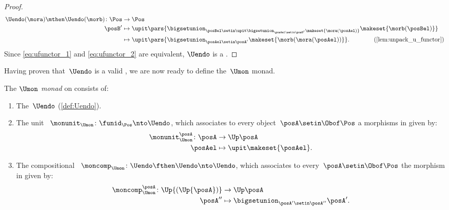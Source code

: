 \begin{proof}
\begin{equation}
\begin{aligned}
            \Uendo(\mora)\mthen \Uendo(\morb)\colon \Pos & \to \Pos \\
            \posB'                                       & \mapsto \upit \pars{\bigsetunion_{\posBel\setin \upit \bigsetunion_{\posAel\setin \posB'}\makeset{\mora(\posAel)}}\makeset{\morb(\posBel)}} \\
                                                         & \mapsto \upit \pars{\bigsetunion_{\posAel\setin \posA'} \makeset{ \morb(\mora(\posAel))}}.
            \qquad \qquad (\cref{lem:unpack_u_functor})
        \end{aligned}
    \end{equation}
    Since \cref{eq:ufunctor_1} and \cref{eq:ufunctor_2} are equivalent, $\Uendo$ is a .
\end{proof}
Having proven that~$\Uendo$ is a valid , we are now ready to define the~$\Umon$ monad.
\begin{definition}
    \label{def:Umon}
    The \emph{$\Umon$ monad} on \Pos consists of:
    \begin{enumerate}
        \item The~$\Uendo$  (\cref{def:Uendo}).
        \item The unit ~$\monunit_{\Umon} \colon \funid_{\Pos}\nto \Uendo$, which associates to every object~$\posA \setin \Obof\Pos$ a morphisms in \Pos given by:
              \begin{equation}
                  \begin{aligned}
                      \monunit_{\Umon}^\posA\colon \posA & \to \Up \posA \\
                      \posAel                            & \mapsto \upit \makeset{\posAel}.
                  \end{aligned}
              \end{equation}
        \item The compositional ~$\moncomp_{\Umon}\colon \Uendo\fthen \Uendo\nto \Uendo$, which associates to every~$\posA\setin \Obof\Pos$ the morphism in \Pos given by:
              \begin{equation}
                  \begin{aligned}
                      \moncomp_{\Umon}^\posA\colon \Up{(\Up{\posA})} & \to \Up \posA \\
                      \posA''                                        & \mapsto \bigsetunion_{\posA'\setin \posA''}\posA'.
                  \end{aligned}
              \end{equation}
    \end{enumerate}
\end{definition}

